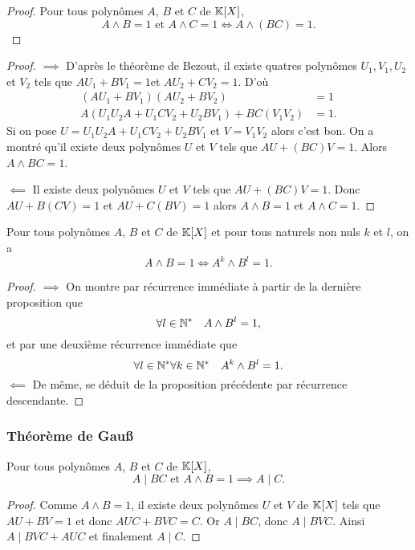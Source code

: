 \begin{proof}
  Pour tous polynômes \(A\), \(B\) et \(C\) de \(\mathbb{K}[X]\),
  \begin{equation}
    A \wedge B =1 \text{~et~} A \wedge C=1 \iff A \wedge (BC) =1.
  \end{equation}
\end{proof}
\begin{proof}
  \(\implies\) D'après le théorème de Bezout, il existe quatres polynômes \(U_1,V_1,U_2\) et \(V_2\) tels que \(AU_1+BV_1=1\)et \(AU_2+CV_2=1\). D'où
  \begin{align}
    (AU_1+BV_1)(AU_2+BV_2)&=1\\
    A(U_1U_2A+U_1CV_2+U_2BV_1)+BC(V_1V_2)&=1.
  \end{align}
  Si on pose \(U=U_1U_2A+U_1CV_2+U_2BV_1\) et \(V=V_1V_2\) alors c'est bon. On a montré qu'il existe deux polynômes \(U\) et \(V\) tels que \(AU+(BC)V=1\). Alors \(A \wedge BC=1\).

  \(\impliedby\) Il existe deux polynômes \(U\) et \(V\) tels que \(AU+(BC)V=1\). Donc \(AU+B(CV)=1\) et \(AU+C(BV)=1\) alors \(A \wedge B=1\) et \(A \wedge C=1\).
\end{proof}

\begin{prop}
  Pour tous polynômes \(A\), \(B\) et \(C\) de \(\mathbb{K}[X]\) et pour tous naturels non nuls \(k\) et \(l\), on a
  \begin{equation}
    A \wedge B =1 \iff A^k \wedge B^l = 1.
  \end{equation}
\end{prop}
\begin{proof}
  \(\implies\) On montre par récurrence immédiate à partir de la dernière proposition que
  \begin{equation}
    \forall l \in \mathbb{N}^* \quad A \wedge B^l = 1,
  \end{equation}
  et par une deuxième récurrence immédiate que
  \begin{equation}
    \forall l \in \mathbb{N}^* \forall k \in \mathbb{N}^* \quad A^k \wedge B^l = 1.
  \end{equation}
  \(\impliedby\)  De même, se déduit de la proposition précédente par récurrence descendante.
\end{proof}

\subsubsection{Théorème de Gau\ss}

\begin{theo}
  Pour tous polynômes \(A\), \(B\) et \(C\) de \(\mathbb{K}[X]\),
  \begin{equation}
    A\mid{}BC \text{~et~} A\wedge B=1 \implies A\mid{}C.
  \end{equation}
\end{theo}
\begin{proof}
  Comme \(A \wedge B=1\), il existe deux polynômes \(U\) et \(V\) de \(\mathbb{K}[X]\) tels que \(AU+BV=1\) et donc \(AUC+BVC=C\). Or \(A\mid{}BC\), donc \(A\mid{}BVC\). Ainsi \(A\mid{}BVC+AUC\) et finalement \(A\mid{}C\).
\end{proof}

